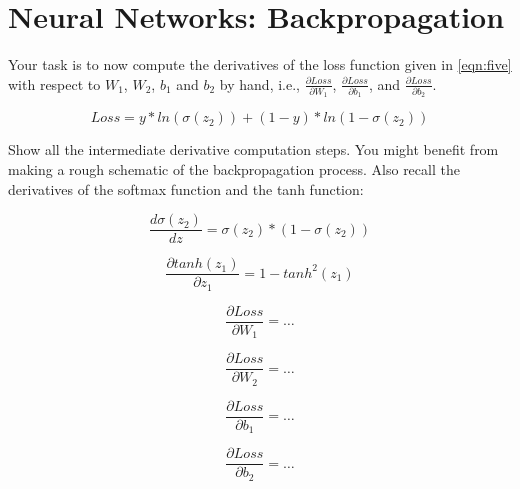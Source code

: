 \section{Neural Networks: Backpropagation}

 Your task is to now compute the derivatives of the loss function given in \ref{eqn:five} with respect to $W_{1}$, $W_{2}$, $b_{1}$ and $b_{2}$ by hand, i.e., $\frac{\partial Loss}{\partial W_{1}}$, $\frac{\partial Loss}{\partial b_{1}}$,  and $\frac{\partial Loss}{\partial b_{2}}$.

\begin{equation}
Loss = y * ln(\sigma(z_{2})) + (1-y) * ln(1-\sigma(z_{2}))
\label{eqn:five}
\end{equation}


Show all the intermediate derivative computation steps. You might benefit from making a rough schematic of the backpropagation process. Also recall the derivatives of the softmax function and the tanh function:

\begin{equation}
\frac{d\sigma(z_{2})}{dz} = \sigma(z_{2}) * (1-\sigma(z_{2}))
\label{eqn:six}
\end{equation}

\begin{equation}
\frac{\partial tanh(z_{1})}{\partial z_{1}} = 1 - tanh^2(z_{1})
\label{eqn:twelve}
\end{equation}

\begin{equation}
\frac{\partial Loss}{\partial W_{1}} = \ldots
\end{equation}

\begin{equation}
\frac{\partial Loss}{\partial W_{2}} = \ldots
\end{equation}

\begin{equation}
\frac{\partial Loss}{\partial b_{1}} = \ldots
\end{equation}

\begin{equation}
\frac{\partial Loss}{\partial b_{2}} = \ldots
\end{equation}

